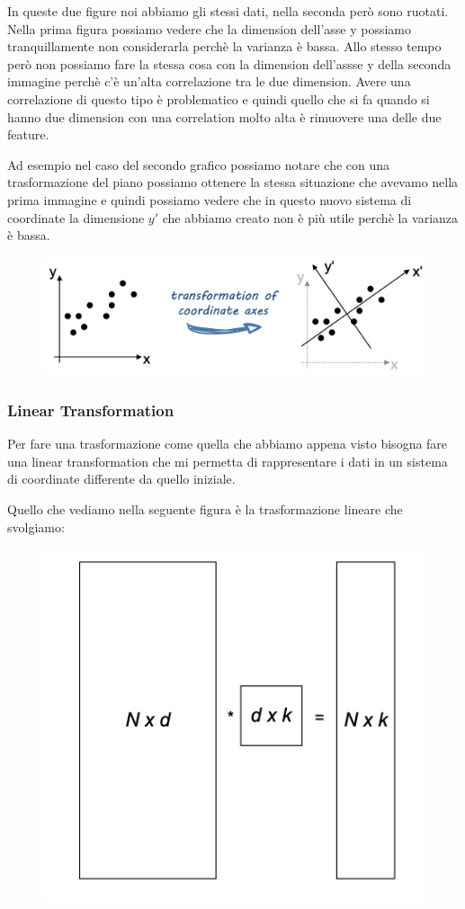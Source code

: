 \documentclass[14pt]{extreport}
\begin{document}
In queste due figure noi abbiamo gli stessi dati, nella seconda però sono ruotati. Nella prima figura possiamo vedere che la dimension dell'asse y
possiamo tranquillamente non considerarla perchè la varianza è bassa. Allo stesso tempo però non possiamo fare la stessa cosa con la dimension
dell'assse y della seconda immagine perchè c'è un'alta correlazione tra le due dimension. Avere una correlazione di questo tipo è problematico e
quindi quello che si fa quando si hanno due dimension con una correlation molto alta è rimuovere una delle due feature.

Ad esempio nel caso del secondo grafico possiamo notare che con una trasformazione del piano possiamo ottenere la stessa situazione che avevamo nella
prima immagine e quindi possiamo vedere che in questo nuovo sistema di coordinate la dimensione $y'$ che abbiamo creato non è più utile perchè la
varianza è bassa.

\begin{figure}[H]
	\centering
	\includegraphics[width=0.7\linewidth]{438.jpeg}
\end{figure}

\subsubsection{Linear Transformation}

Per fare una trasformazione come quella che abbiamo appena visto bisogna fare una linear transformation che mi permetta di rappresentare i dati in un
sistema di coordinate differente da quello iniziale.

Quello che vediamo nella seguente figura è la trasformazione lineare che svolgiamo:

\begin{figure}[H]
	\centering
	\includegraphics[width=0.7\linewidth]{439.jpeg}
\end{figure}
\end{document}

